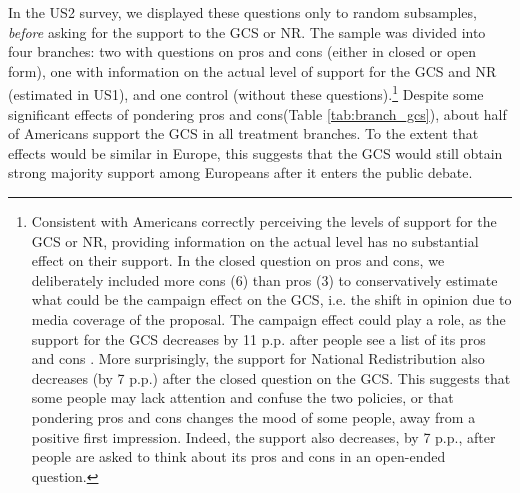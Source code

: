 In the US2 survey, we displayed these questions only to random subsamples, \textit{before} asking for the support to the GCS or NR. The sample was divided into four branches: two with questions on pros and cons (either in closed or open form), one with information on the actual level of support for the GCS and NR (estimated in US1), and one control (without these questions).\footnote{Consistent with Americans correctly perceiving the levels of support for the GCS or NR, providing information on the actual level has no substantial effect on their support. In the closed question on pros and cons, we deliberately included more cons (6) than pros (3) to conservatively estimate what could be the campaign effect on the GCS, i.e. the shift in opinion due to media coverage of the proposal. The campaign effect could play a role, as the support for the GCS decreases by 11 p.p. after people see a list of its pros and cons%
. More surprisingly, the support for National Redistribution also decreases (by 7 p.p.) after the closed question on the GCS. This suggests that some people may lack attention and confuse the two policies, or that pondering pros and cons changes the mood of some people, away from a positive first impression. Indeed, the support also decreases, by 7 p.p., after people are asked to think about its pros and cons in an open-ended question.} Despite some significant effects of pondering pros and cons(Table \ref{tab:branch_gcs}), about half of Americans support the GCS in all treatment branches. To the extent that effects would be similar in Europe, this suggests that the GCS would still obtain strong majority support among Europeans after it enters the public debate. 


